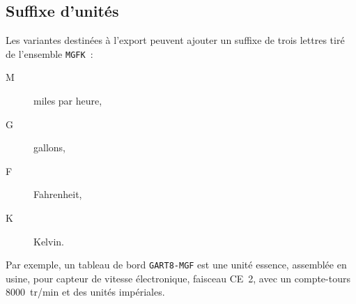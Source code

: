 \subsection{Suffixe d'unités}
Les variantes destinées à l'export peuvent ajouter un suffixe de trois lettres tiré de l'ensemble \texttt{MGFK}~:
\begin{description}
    \item[M] miles par heure,
    \item[G] gallons,
    \item[F] Fahrenheit,
    \item[K] Kelvin.
\end{description}
Par exemple, un tableau de bord \texttt{GART8-MGF} est une unité essence, assemblée en usine, pour capteur de vitesse électronique, faisceau CE~2, avec un compte-tours 8000~tr/min et des unités impériales.

